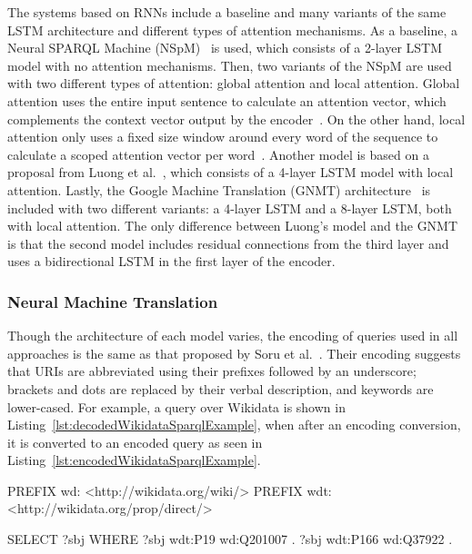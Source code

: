 The systems based on RNNs include a baseline and many variants of the same LSTM architecture 
and different types of attention mechanisms. As a baseline, a Neural SPARQL Machine 
(NSpM)~\cite{nmt:nspm-SoruMMPVEN17, nmt:CoRRSoru18} is used, which consists of a 2-layer LSTM 
model with no attention mechanisms. Then, two variants of the NSpM are used with two different 
types of attention: global attention and local attention. Global attention uses the entire 
input sentence to calculate an attention vector, which complements the context vector output by 
the encoder~\cite{nlToSparql:BahdanauCB14}. On the other hand, local attention only uses a 
fixed size window around every word of the sequence to calculate a scoped attention vector per 
word~\cite{nlToSparql:LuongPM15}. Another model is based on a proposal from 
Luong et al.~\cite{nlToSparql:LuongPM15}, which consists of a 4-layer LSTM model with local 
attention. Lastly, the Google Machine Translation (GNMT) architecture~\cite{nlToSparql:WuSCLNMKCGMKSJL16} 
is included with two different variants: a 4-layer LSTM and a 8-layer LSTM, both with local 
attention. The only difference between Luong’s model and the GNMT is that the second model 
includes residual connections from the third layer and uses a bidirectional LSTM in the first 
layer of the encoder.

\subsubsection{Neural Machine Translation}
\label{cap2:theoFrame/semPar/nlToSparql/nmt}
Though the architecture of each model varies, the encoding of \SPARQL{} queries used in all 
approaches is the same as that proposed by Soru et al.~\cite{nmt:nspm-SoruMMPVEN17}. Their 
encoding suggests that URIs are abbreviated using their prefixes  followed by an underscore; 
brackets and dots are replaced by their verbal description, and \SPARQL{} keywords are lower-cased. 
For example, a query over Wikidata is shown in Listing~\ref{lst:decodedWikidataSparqlExample}, 
when after an encoding conversion, it is converted to an encoded query as seen in 
Listing~\ref{lst:encodedWikidataSparqlExample}.

\begin{sparqlcode}[%
    caption={\SPARQL{} query before encoding.}, 
    label={lst:decodedWikidataSparqlExample}]
PREFIX wd: <http://wikidata.org/wiki/>
PREFIX wdt: <http://wikidata.org/prop/direct/>

SELECT ?sbj 
WHERE {
    ?sbj wdt:P19 wd:Q201007 .
    ?sbj wdt:P166 wd:Q37922 .
}
\end{sparqlcode}

